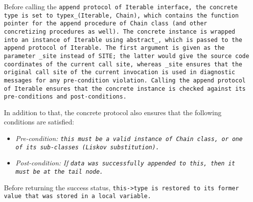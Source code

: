 
Before calling the \tt{append} protocol of \tt{Iterable} interface,
the concrete type is set to \tt{typex_(Iterable, Chain)},
which contains the function pointer for the \tt{append} procedure
of \tt{Chain} class (and other concretizing procedures as well).
The concrete instance is wrapped into an instance of \tt{Iterable} using
\tt{abstract_}, which is passed to the \tt{append} protocol of \tt{Iterable}.
The first argument is given as the parameter \tt{_site} instead of \tt{SITE};
the latter would give the source code coordinates of the current call site,
whereas \tt{_site} ensures that the original call site of the current
invocation is used in diagnostic messages for any pre-condition violation.
Calling the \tt{append} protocol of \tt{Iterable} ensures that the concrete
instance is checked against its pre-conditions and post-conditions.

In addition to that, the concrete protocol also
ensures that the following conditions are satisfied:

\begin{itemize}

\item \it{Pre-condition}: \tt{this} must be a valid instance of
\tt{Chain} class, or one of its sub-classes (Liskov substitution).

\item \it{Post-condition}: If \tt{data} was successfully
appended to \tt{this}, then it must be at the \tt{tail} node.

\end{itemize}

Before returning the success status, \tt{this->type} is
restored to its former value that was stored in a local variable.

